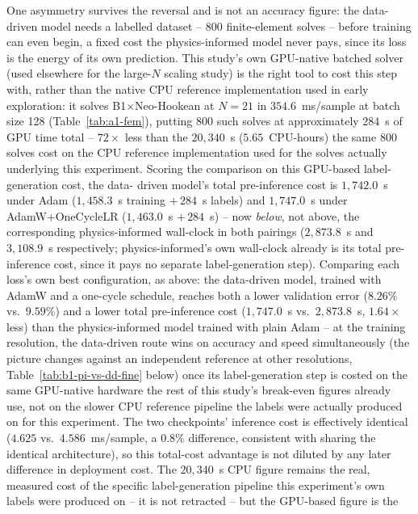 \documentclass[final,5p,times]{elsarticle}
\begin{document}
One asymmetry survives the reversal and is not an accuracy figure: the
data-driven model needs a labelled dataset -- 800 finite-element solves --
before training can even begin, a fixed cost the physics-informed model
never pays, since its loss is the energy of its own prediction. This
study's own GPU-native batched solver (used elsewhere for the large-$N$
scaling study) is the right tool to cost this step with, rather than the
native CPU reference implementation used in early exploration: it solves
B1$\times$Neo-Hookean at $N{=}21$ in $354.6$~ms/sample at batch size 128
(Table~\ref{tab:a1-fem}), putting 800 such solves at approximately
$284$~s of GPU time total -- $72\times$ less than the $20{,}340$~s
($5.65$~CPU-hours) the same 800 solves cost on the CPU reference
implementation used for the solves actually underlying this experiment.
Scoring the comparison on this GPU-based label-generation cost, the data-
driven model's total pre-inference cost is $1{,}742.0$~s under Adam
($1{,}458.3$~s training $+\,284$~s labels) and $1{,}747.0$~s under
AdamW+OneCycleLR ($1{,}463.0$~s $+\,284$~s) -- now \emph{below}, not
above, the corresponding physics-informed wall-clock in both pairings
($2{,}873.8$~s and $3{,}108.9$~s respectively; physics-informed's own
wall-clock already is its total pre-inference cost, since it pays no
separate label-generation step). Comparing each loss's own best
configuration, as above: the data-driven model, trained with AdamW and a
one-cycle schedule, reaches both a lower validation error ($8.26\%$
vs.\ $9.59\%$) and a lower total pre-inference cost ($1{,}747.0$~s
vs.\ $2{,}873.8$~s, $1.64\times$ less) than the physics-informed model
trained with plain Adam -- at the training resolution, the data-driven
route wins on accuracy and speed simultaneously (the picture changes
against an independent reference at other resolutions,
Table~\ref{tab:b1-pi-vs-dd-fine} below) once its label-generation step is costed on the same
GPU-native hardware the rest of this study's break-even figures already
use, not on the slower CPU reference pipeline the labels were actually
produced on for this experiment. The two checkpoints' inference cost is
effectively identical ($4.625$ vs.\ $4.586$~ms/sample, a $0.8\%$
difference, consistent with sharing the identical architecture), so this
total-cost advantage is not diluted by any later difference in deployment
cost. The $20{,}340$~s CPU figure remains the real, measured cost of the
specific label-generation pipeline this experiment's own labels were
produced on -- it is not retracted -- but the GPU-based figure is the
\end{document}
